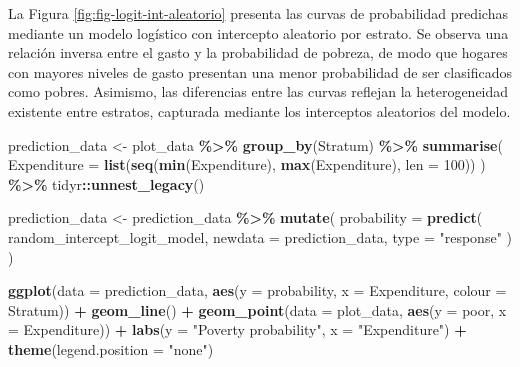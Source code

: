 \documentclass[
  spanish,
  12pt,
]{book}
\newenvironment{Shaded}{\begin{snugshade}}{\end{snugshade}}
\newcommand{\AttributeTok}[1]{\textcolor[rgb]{0.13,0.29,0.53}{#1}}
\newcommand{\DecValTok}[1]{\textcolor[rgb]{0.00,0.00,0.81}{#1}}
\newcommand{\FunctionTok}[1]{\textcolor[rgb]{0.13,0.29,0.53}{\textbf{#1}}}
\newcommand{\NormalTok}[1]{#1}
\newcommand{\OtherTok}[1]{\textcolor[rgb]{0.56,0.35,0.01}{#1}}
\newcommand{\SpecialCharTok}[1]{\textcolor[rgb]{0.81,0.36,0.00}{\textbf{#1}}}
\newcommand{\StringTok}[1]{\textcolor[rgb]{0.31,0.60,0.02}{#1}}
\newcounter{none} %
\begin{document}
La Figura \ref{fig:fig-logit-int-aleatorio} presenta las curvas de probabilidad predichas mediante un modelo logístico con intercepto aleatorio por estrato. Se observa una relación inversa entre el gasto y la probabilidad de pobreza, de modo que hogares con mayores niveles de gasto presentan una menor probabilidad de ser clasificados como pobres. Asimismo, las diferencias entre las curvas reflejan la heterogeneidad existente entre estratos, capturada mediante los interceptos aleatorios del modelo.

\begin{Shaded}
\begin{Highlighting}[]
\NormalTok{prediction\_data }\OtherTok{\textless{}{-}}\NormalTok{ plot\_data }\SpecialCharTok{\%\textgreater{}\%}
  \FunctionTok{group\_by}\NormalTok{(Stratum) }\SpecialCharTok{\%\textgreater{}\%}
  \FunctionTok{summarise}\NormalTok{(}
    \AttributeTok{Expenditure =} \FunctionTok{list}\NormalTok{(}\FunctionTok{seq}\NormalTok{(}\FunctionTok{min}\NormalTok{(Expenditure), }\FunctionTok{max}\NormalTok{(Expenditure), }\AttributeTok{len =} \DecValTok{100}\NormalTok{))}
\NormalTok{  ) }\SpecialCharTok{\%\textgreater{}\%}
\NormalTok{  tidyr}\SpecialCharTok{::}\FunctionTok{unnest\_legacy}\NormalTok{()}

\NormalTok{prediction\_data }\OtherTok{\textless{}{-}}\NormalTok{ prediction\_data }\SpecialCharTok{\%\textgreater{}\%}
  \FunctionTok{mutate}\NormalTok{(}
    \AttributeTok{probability =} \FunctionTok{predict}\NormalTok{(}
\NormalTok{      random\_intercept\_logit\_model,}
      \AttributeTok{newdata =}\NormalTok{ prediction\_data,}
      \AttributeTok{type =} \StringTok{"response"}
\NormalTok{    )}
\NormalTok{  )}
\end{Highlighting}
\end{Shaded}

\begin{Shaded}
\begin{Highlighting}[]
\FunctionTok{ggplot}\NormalTok{(}\AttributeTok{data =}\NormalTok{ prediction\_data,}
       \FunctionTok{aes}\NormalTok{(}\AttributeTok{y =}\NormalTok{ probability, }\AttributeTok{x =}\NormalTok{ Expenditure, }\AttributeTok{colour =}\NormalTok{ Stratum)) }\SpecialCharTok{+}
  \FunctionTok{geom\_line}\NormalTok{() }\SpecialCharTok{+}
  \FunctionTok{geom\_point}\NormalTok{(}\AttributeTok{data =}\NormalTok{ plot\_data,}
             \FunctionTok{aes}\NormalTok{(}\AttributeTok{y =}\NormalTok{ poor, }\AttributeTok{x =}\NormalTok{ Expenditure)) }\SpecialCharTok{+}
  \FunctionTok{labs}\NormalTok{(}\AttributeTok{y =} \StringTok{"Poverty probability"}\NormalTok{, }\AttributeTok{x =} \StringTok{"Expenditure"}\NormalTok{) }\SpecialCharTok{+}
  \FunctionTok{theme}\NormalTok{(}\AttributeTok{legend.position =} \StringTok{"none"}\NormalTok{)}
\end{Highlighting}
\end{Shaded}
\end{document}
